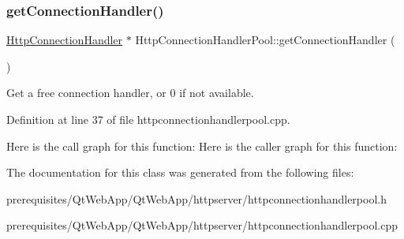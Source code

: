 \subsubsection{\texorpdfstring{get\+Connection\+Handler()}{getConnectionHandler()}}
{\footnotesize\ttfamily \mbox{\hyperlink{classstefanfrings_1_1_http_connection_handler}{Http\+Connection\+Handler}} $\ast$ Http\+Connection\+Handler\+Pool\+::get\+Connection\+Handler (\begin{DoxyParamCaption}{ }\end{DoxyParamCaption})}

Get a free connection handler, or 0 if not available. 

Definition at line 37 of file httpconnectionhandlerpool.\+cpp.

Here is the call graph for this function\+:
Here is the caller graph for this function\+:


The documentation for this class was generated from the following files\+:\begin{DoxyCompactItemize}
\item 
prerequisites/\+Qt\+Web\+App/\+Qt\+Web\+App/httpserver/httpconnectionhandlerpool.\+h\item 
prerequisites/\+Qt\+Web\+App/\+Qt\+Web\+App/httpserver/httpconnectionhandlerpool.\+cpp\end{DoxyCompactItemize}

